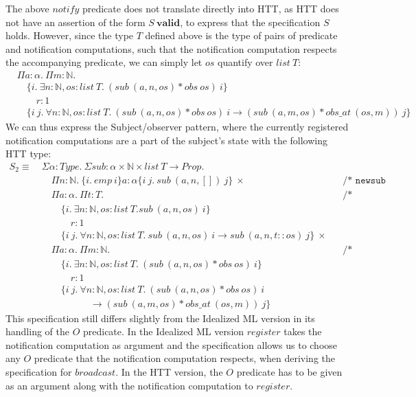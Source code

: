 \documentclass[a4paper,english]{article}
\newcommand{\N}[0]{\mathbb{N}}
\newcommand{\HPROP}[0]{Prop}
\newcommand{\TYPE}[0]{Type}
\newcommand{\LIST}[0]{list}
\newcommand{\VALID}[0]{\mathbf{valid}}
\newcommand{\pname}[1]{\texttt{/* #1 */}}
\begin{document}
The above $notify$ predicate does not translate directly into HTT, as HTT does
not have an assertion of the form $S\ \VALID$, to express that the
specification $S$ holds. However, since the type $T$ defined above is the type
of pairs of predicate and notification computations, such that the notification
computation respects the accompanying predicate, we can simply let $os$
quantify over $list\ T$:
\begin{align*}
&\Pi a : \alpha.\ \Pi m : \N.\\
&\quad\{ i.\ \exists n : \N, os : list\ T.\ (sub\ (a, n, os) * obs\ os)\ i \}\\
&\quad\quad r : 1\\
&\quad \{ i\ j.\ \forall n : \N, os : list\ T.\ (sub\ (a, n, os) * obs\ os)\ i \rightarrow (sub\ (a, m, os) * obs\_at\ (os, m))\ j \} 
\end{align*}
We can thus express the Subject/observer pattern, where the currently
registered notification computations are a part of the subject's state with the
following HTT type:
\begin{align*}
S_2 \equiv\ &\Sigma \alpha : \TYPE.\ \Sigma sub : \alpha \times \N \times \LIST\ T
\rightarrow \HPROP.\\
&\quad \Pi n : \N.\ \{ i.\ emp\ i \} a : \alpha \{ i\ j.\ sub\ (a, n, [])\ j \}\ \times && \pname{newsub}\\
&\quad \Pi a : \alpha.\ \Pi t : T. && \pname{register}\\
&\quad\quad\{ i.\ \exists n : \N, os : list\ T. sub\ (a, n, os)\ i \}\\
&\quad\quad\quad r : 1\\
&\quad\quad \{ i\ j.\ \forall n : \N, os : list\ T.\ sub\ (a, n, os)\ i \rightarrow sub\ (a, n, t::os)\ j
\}\ \times\\
&\quad \Pi a : \alpha.\ \Pi m : \N. && \pname{broadcast}\\
&\quad\quad\{ i.\ \exists n : \N, os : list\ T.\ (sub\ (a, n, os) * obs\ os)\ i \}\\
&\quad\quad\quad r : 1\\
&\quad\quad \{ i\ j.\ \forall n : \N, os : list\ T.\ (sub\ (a, n, os) * obs\ os)\ i\\
&\quad\quad\quad\quad\quad \rightarrow (sub\ (a, m, os) * obs\_at\ (os, m))\ j \}
\end{align*}
This specification still differs slightly from the Idealized ML version in its
handling of the $O$ predicate. In the Idealized ML version $register$ takes the
notification computation as argument and the specification allows us to choose
any $O$ predicate that the notification computation respects, when deriving the
specification for $broadcast$. In the HTT version, the $O$ predicate has to be
given as an argument along with the notification computation to $register$. 
\end{document}
